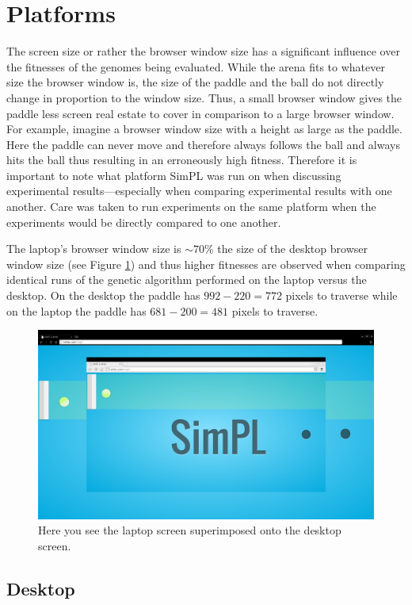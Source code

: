 \documentclass[a4paper,10pt]{article}
\begin{document}
\section{Platforms}

The screen size or rather the browser window size has a significant influence over the fitnesses of the genomes being evaluated. While the arena fits to whatever size the browser window is, the size of the paddle and the ball do not directly change in proportion to the window size. Thus, a small browser window gives the paddle less screen real estate to cover in comparison to a large browser window. For example, imagine a browser window size with a height as large as the paddle. Here the paddle can never move and therefore always follows the ball and always hits the ball thus resulting in an erroneously high fitness. Therefore it is important to note what platform SimPL was run on when discussing experimental results---especially when comparing experimental results with one another. Care was taken to run experiments on the same platform when the experiments would be directly compared to one another. 

The laptop's browser window size is $\sim70\%$ the size of the desktop browser window size (see Figure \ref{fig:platform_sizes}) and thus higher fitnesses are observed when comparing identical runs of the genetic algorithm performed on the laptop versus the desktop. On the desktop the paddle has $992-220=772$ pixels to traverse while on the laptop the paddle has $681-200=481$ pixels to traverse.

\begin{figure}[H]  
  \centering
  \includegraphics[width=.666\textwidth]{figures/platform_sizes.png}
  \caption{Here you see the laptop screen superimposed onto the desktop screen.}
  \label{fig:platform_sizes}
\end{figure}


\subsection{Desktop}
\end{document}
